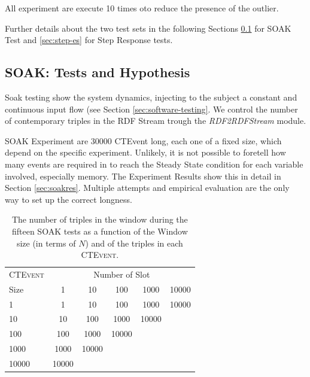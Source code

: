 All experiment are execute 10 times oto reduce the presence of the outlier.

Further details about the two test sets in the following Sections \ref{sec:soak-es} for SOAK Test and \ref{sec:step-es} for Step Response tests.

\subsection{SOAK: Tests and Hypothesis}\label{sec:soak-es}

Soak testing show the system dynamics, injecting to the subject a constant and continuous input flow (see Section \ref{sec:software-testing}.  We control the number of contemporary triples in the RDF Stream trough the \textit{RDF2RDFStream} module. %

SOAK Experiment are 30000 CTEvent long, each one of a fixed size, which depend on the specific experiment. Unlikely, it is not possible to foretell how many events are required in to reach the Steady State condition for each variable involved, especially memory. The Experiment Results show this in detail in Section \ref{sec:soakres}. Multiple attempts and empirical evaluation are the only way to set up the correct longness.

\begin{table}[htb]
\centering
 \begin{tabular}{l| ccccc}
	  	\hline
		\textsc{CTEvent}  &\multicolumn{5}{c}{Number of Slot}  \\
		Size  & 1 & 10 & 100 & 1000&10000 \\
		\hline	
		1 & 1& 10 & 100 & 1000&10000 \\
		10  & 10 & 100 & 1000&10000 \\
		100 & 100&1000&10000  \\
		1000 &1000 & 10000 \\
		10000&10000  \\
		\hline 
	\end{tabular}
	
	 \vspace{10pt}
	\caption{The number of triples in the window during the fifteen SOAK tests as a function of the Window size (in terms of $N$) and of the triples in each \textsc{CTEvent}.}
	\label{tab:soaktests}
\end{table}


